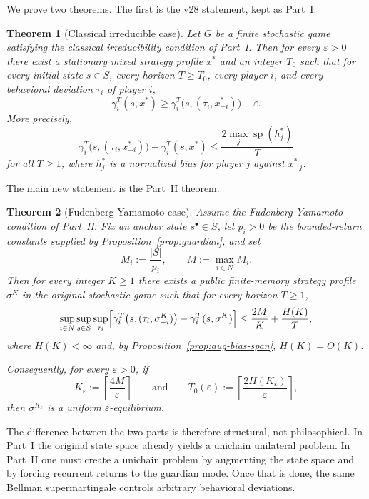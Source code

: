 \documentclass[11pt]{article}
\newtheorem{theorem}{Theorem}[section]
\theoremstyle{definition}
\newcommand{\1}{\mathbf{1}}
\DeclareMathOperator{\spn}{sp}
\begin{document}
We prove two theorems. The first is the v28 statement, kept as Part~I.

\begin{theorem}[Classical irreducible case]\label{thm:intro-main}
Let $G$ be a finite stochastic game satisfying the classical irreducibility condition of Part~I. Then for every $\varepsilon>0$ there exist a stationary mixed strategy profile $x^*$ and an integer $T_0$ such that for every initial state $s\in S$, every horizon $T\ge T_0$, every player $i$, and every behavioral deviation $\tau_i$ of player $i$,
\[
\gamma_i^T(s,x^*)\ge \gamma_i^T\bigl(s,(\tau_i,x_{-i}^*)\bigr)-\varepsilon.
\]
More precisely,
\[
\gamma_i^T\bigl(s,(\tau_i,x_{-i}^*)\bigr)-\gamma_i^T(s,x^*)
\le \frac{2\max_j\spn(h_j^*)}{T}
\]
for all $T\ge1$, where $h_j^*$ is a normalized bias for player $j$ against $x_{-j}^*$.
\end{theorem}

The main new statement is the Part~II theorem.

\begin{theorem}[Fudenberg-Yamamoto case]\label{thm:intro-fy}
Assume the Fudenberg-Yamamoto condition of Part~II. Fix an anchor state $s^\bullet\in S$, let $p_i>0$ be the bounded-return constants supplied by Proposition~\ref{prop:guardian}, and set
\[
M_i:=\frac{|S|}{p_i},
\qquad
M:=\max_{i\in N}M_i.
\]
Then for every integer $K\ge1$ there exists a public finite-memory strategy profile $\sigma^K$ in the original stochastic game such that for every horizon $T\ge1$,
\[
\sup_{i\in N}\sup_{s\in S}\sup_{\tau_i}
\Bigl[\gamma_i^T\bigl(s,(\tau_i,\sigma_{-i}^K)\bigr)-\gamma_i^T(s,\sigma^K)\Bigr]
\le \frac{2M}{K}+\frac{H(K)}{T},
\]
where $H(K)<\infty$ and, by Proposition~\ref{prop:aug-bias-span}, $H(K)=O(K)$.

Consequently, for every $\varepsilon>0$, if
\[
K_\varepsilon:=\left\lceil \frac{4M}{\varepsilon}\right\rceil
\qquad\text{and}\qquad
T_0(\varepsilon):=\left\lceil \frac{2H(K_\varepsilon)}{\varepsilon}\right\rceil,
\]
then $\sigma^{K_\varepsilon}$ is a uniform $\varepsilon$-equilibrium.
\end{theorem}

The difference between the two parts is therefore structural, not philosophical. In Part~I the original state space already yields a unichain unilateral problem. In Part~II one must create a unichain problem by augmenting the state space and by forcing recurrent returns to the guardian mode. Once that is done, the same Bellman supermartingale controls arbitrary behavioral deviations.
\end{document}
